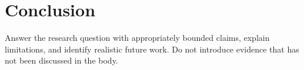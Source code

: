 \section{Conclusion}
Answer the research question with appropriately bounded claims, explain limitations, and identify realistic future work. Do not introduce evidence that has not been discussed in the body.
\clearpage\begingroup
\renewcommand{\bibsection}{\section*{References}\addcontentsline{toc}{section}{References}}
\renewcommand{\bibfont}{\rmfamily\zihao{5}}

\endgroup
